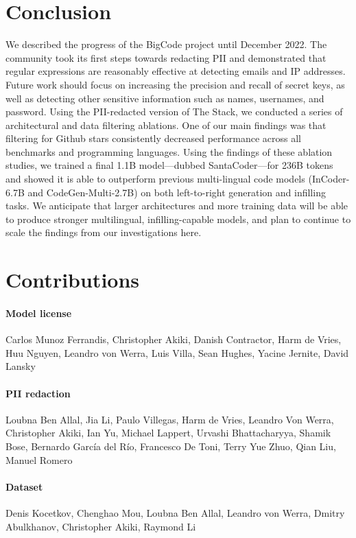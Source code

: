 \documentclass[10pt]{article} \usepackage{iclr2023_conference,times}
\begin{document}
\section{Conclusion}
We described the progress of the BigCode project until December 2022. The community took its first steps towards redacting PII and demonstrated that regular expressions are reasonably effective at detecting emails and IP addresses. Future work should focus on increasing the precision and recall of secret keys, as well as detecting other sensitive information such as names, usernames, and password. Using the PII-redacted version of The Stack, we conducted a series of architectural and data filtering ablations. One of our main findings was that filtering for Github stars consistently decreased performance across all benchmarks and programming languages. Using the findings of these ablation studies, we trained a final 1.1B model---dubbed SantaCoder---for 236B tokens and showed it is able to outperform previous multi-lingual code models (InCoder-6.7B and CodeGen-Multi-2.7B) on both left-to-right generation and infilling tasks. We anticipate that larger architectures and more training data will be able to produce stronger multilingual, infilling-capable models, and plan to continue to scale the findings from our investigations here.

\newpage
\section{Contributions}

\paragraph{Model license}
Carlos Munoz Ferrandis, Christopher Akiki, Danish Contractor, Harm de Vries, Huu Nguyen, Leandro von Werra, Luis Villa, Sean Hughes, Yacine Jernite, David Lansky

\paragraph{PII redaction}
Loubna Ben Allal,  Jia Li, Paulo Villegas, Harm de Vries, Leandro Von Werra, Christopher Akiki, Ian Yu, Michael Lappert, Urvashi Bhattacharyya, Shamik Bose, Bernardo García del Río, Francesco De Toni, Terry Yue Zhuo, Qian Liu, Manuel Romero

\paragraph{Dataset}
Denis Kocetkov, Chenghao Mou, Loubna Ben Allal, Leandro von Werra, Dmitry Abulkhanov, Christopher Akiki, Raymond Li
\end{document}
